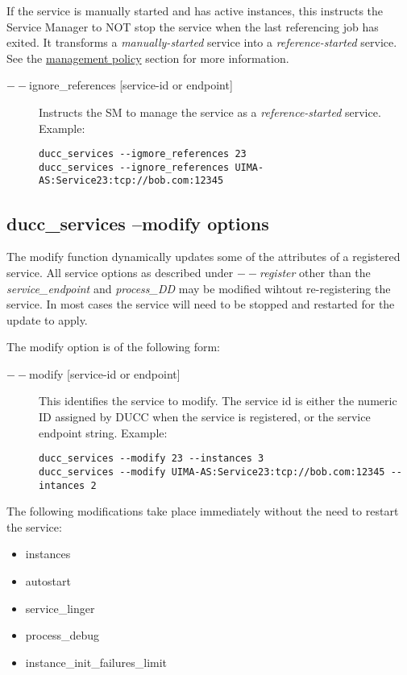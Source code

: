     If the service is manually started and has active instances, this instructs the Service Manager
    to NOT stop the service when the last referencing job has exited.  It transforms a {\em manually-started}
    service into a {\em reference-started} service. See the \hyperref[sec:service.management-policy]{management policy} section for
    more information. 
       \begin{description}
       \item[$--$ignore\_references {[service-id or endpoint]}] Instructs the SM to manage the
         service as a {\em reference-started} service. Example:
\begin{verbatim}
ducc_services --igmore_references 23 
ducc_services --ignore_references UIMA-AS:Service23:tcp://bob.com:12345 
\end{verbatim}
         
       \end{description}


    \subsection{ducc\_services --modify options}
    The modify function dynamically updates some of the attributes of a registered service.  All
    service options as described under {\em $--$register} other than the {\em service\_endpoint} 
    and {\em process\_DD} may be modified wihtout re-registering the service.  In most cases the
    service will need to be stopped and restarted for the update to apply. 
    
    The modify option is of the following form:
    \begin{description}

        \item[$--$modify {[service-id or endpoint]}]  This identifies the service to modify. The service id is either
          the numeric ID assigned by DUCC when the service is registered, or the service endpoint
          string.  Example:
\begin{verbatim}
ducc_services --modify 23 --instances 3 
ducc_services --modify UIMA-AS:Service23:tcp://bob.com:12345 --intances 2 
\end{verbatim}    
    \end{description}

    The following modifications take place immediately without the need to restart the service:
    \begin{itemize}
      \item instances
      \item autostart
      \item service\_linger
      \item process\_debug
      \item instance\_init\_failures\_limit
    \end{itemize}
      
